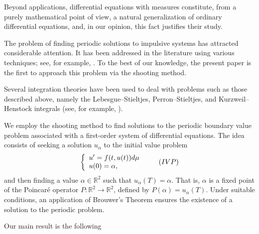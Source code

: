 \documentclass[a4paper,11pt]{amsart}
\theoremstyle{plain}
\theoremstyle{remark}
\newcommand{\rr}{\mathbb{R}}
\numberwithin{equation}{section}
\begin{document}
Beyond applications, differential equations with measures constitute, from a purely mathematical point of view, a natural generalization of ordinary differential equations, and, in our opinion, this fact justifies their study.

The problem of finding periodic solutions to impulsive systems has attracted considerable attention. It has been addressed in the literature using various techniques; see, for example, \cite{Zhang-2010,Li-2014,Tian-2008,daoudi2013variational,li2020infinitely,Jingl-2013,zhang2008periodic,yang2011periodic,graef2015nontrivial,Liu-2019,heidarkhani2015infinitely}. To the best of our knowledge, the present paper is the first to approach this problem via the shooting method.  

Several integration theories have been used to deal with problems such as those described above, namely the Lebesgue--Stieltjes, Perron--Stieltjes, and Kurzweil--Henstock integrals (see, for example, \cite{S.Schwabik320,JaroslavKurzweil1411,StefanSchwabik75,EveraldoM.Bonotto420}).

We employ the shooting method to find solutions to the periodic boundary value problem associated with a first-order system of differential equations. The idea consists of seeking a solution $u_\alpha$ to the initial value problem  
	\begin{equation}\label{eq:pvi}
	\left\lbrace \begin{array}{l}
		u'=f(t,u(t))d\mu\\
		u(0)=\alpha,
	\end{array}\right. \tag{${IVP}$}
\end{equation}
and then finding a value $\alpha\in\rr^2$ such that $u_\alpha(T)=\alpha$. That is, $\alpha$ is a fixed point of the Poincaré operator $P:\rr^2\to \rr^2$, defined by $P(\alpha)=u_\alpha(T)$. Under suitable conditions, an application of Brouwer's Theorem ensures the existence of a solution to the periodic problem.

Our main result is the following
\end{document}
